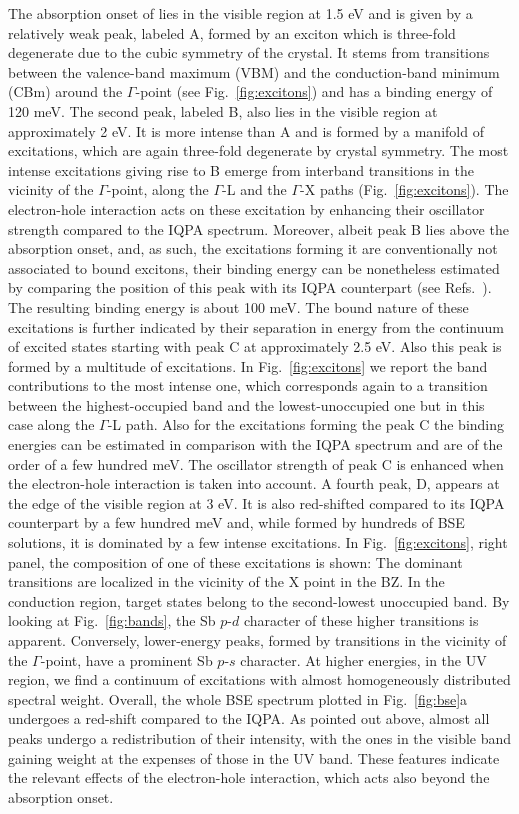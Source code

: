 \documentclass[aps,pra,superscriptaddress,twocolumn]{revtex4}
\begin{document}
The absorption onset of  lies in the visible region at 1.5 eV and is given by a relatively weak peak, labeled A, formed by an exciton which is three-fold degenerate due to the cubic symmetry of the crystal. 
It stems from transitions between the valence-band maximum (VBM) and the conduction-band minimum (CBm) around the $\Gamma$-point (see Fig.~\ref{fig:excitons}) and has a binding energy of 120 meV.
The second peak, labeled B, also lies in the visible region at approximately 2 eV.
It is more intense than A and is formed by a manifold of excitations, which are again three-fold degenerate by crystal symmetry. 
The most intense excitations giving rise to B emerge from interband transitions in the vicinity of the $\Gamma$-point, along the $\Gamma$-L and the $\Gamma$-X paths (Fig.~\ref{fig:excitons}).
The electron-hole interaction acts on these excitation by enhancing their oscillator strength compared to the IQPA spectrum.
Moreover, albeit peak B lies above the absorption onset, and, as such, the excitations forming it are conventionally not associated to bound excitons, their binding energy can be nonetheless estimated by comparing the position of this peak with its IQPA counterpart (see Refs.~\cite{aggo+17jpcl,aggo+18prb}).
The resulting binding energy is about 100 meV.
The bound nature of these excitations is further indicated by their separation in energy from the continuum of excited states starting with peak C at approximately 2.5 eV.
Also this peak is formed by a multitude of excitations.
In Fig.~\ref{fig:excitons} we report the band contributions to the most intense one, which corresponds again to a transition between the highest-occupied band and the lowest-unoccupied one but in this case along the $\Gamma$-L path.
Also for the excitations forming the peak C the binding energies can be estimated in comparison with the IQPA spectrum and are of the order of a few hundred meV. 
The oscillator strength of peak C is enhanced when the electron-hole interaction is taken into account.
A fourth peak, D, appears at the edge of the visible region at 3 eV.
It is also red-shifted compared to its IQPA counterpart by a few hundred meV and, while formed by hundreds of BSE solutions, it is dominated by a few intense excitations.
In Fig.~\ref{fig:excitons}, right panel, the composition of one of these excitations is shown: The dominant transitions are localized in the vicinity of the X point in the BZ.
In the conduction region, target states belong to the second-lowest unoccupied band.
By looking at Fig.~\ref{fig:bands}, the Sb $p$-$d$ character of these higher transitions is apparent.
Conversely, lower-energy peaks, formed by transitions in the vicinity of the $\Gamma$-point, have a prominent Sb $p$-$s$ character.
At higher energies, in the UV region, we find a continuum of excitations with almost homogeneously distributed spectral weight.
Overall, the whole BSE spectrum plotted in Fig.~\ref{fig:bse}a undergoes a red-shift compared to the IQPA. 
As pointed out above, almost all peaks undergo a redistribution of their intensity, with the ones in the visible band gaining weight at the expenses of those in the UV band.
These features indicate the relevant effects of the electron-hole interaction, which acts also beyond the absorption onset. 
\end{document}

